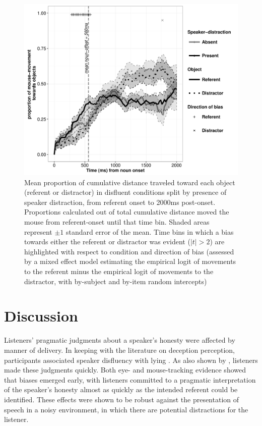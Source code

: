 \documentclass[a4paper,man,natbib]{apa6}
\begin{document}
\begin{figure}[Ht]
  \centering
	\includegraphics[width=\linewidth]{mouse_disf.pdf}
  \caption{Mean proportion of cumulative distance traveled toward each object (referent or distractor) in disfluent conditions split by presence of speaker distraction, from referent onset to 2000ms post-onset. Proportions calculated out of total cumulative distance moved the mouse from referent-onset until that time bin. Shaded areas represent $\pm 1$ standard error of the mean. Time bins in which a bias towards either the referent or distractor was evident ($|t|>2$) are highlighted with respect to condition and direction of bias (assessed by a mixed effect model estimating the empirical logit of movements to the referent minus the empirical logit of movements to the distractor, with by-subject and by-item random intercepts)}
  \label{fig:mdis}
\end{figure}


\section{Discussion}
Listeners' pragmatic judgments about a speaker's honesty were affected by manner of delivery.
In keeping with the literature on deception perception, participants associated speaker disfluency with lying \citep{Zuckerman1981,depaulo2003cues}. 
As also shown by \citet{Loy2016}, listeners made these judgments quickly.
Both eye- and mouse-tracking evidence showed that biases emerged early, with listeners committed to a pragmatic interpretation of the speaker's honesty almost as quickly as the intended referent could be identified.
These effects were shown to be robust against the presentation of speech in a noisy environment, in which there are potential distractions for the listener.
\end{document}
